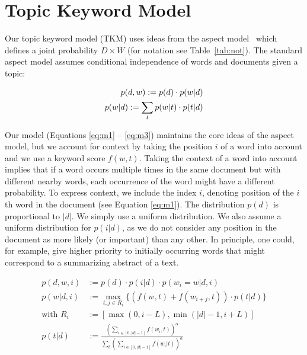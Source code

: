 \documentclass[twocolumn,10]{article}
\newcommand{\ci}{~\cite} \newcommand{\re}{~\ref} \newcommand{\ma}{\mathbb}
\begin{document}
	\section{Topic Keyword Model} \label{sec:tom}
	Our topic keyword model (TKM) uses ideas from the aspect model\ci{hof01} which defines a joint probability $D \times W$ (for notation see Table\re{tab:not}). The standard aspect model assumes conditional independence of words and documents given a topic: 
	
	\begin{footnotesize}
		\begin{equation} 
		\begin{aligned}		
		p(d,w):= p(d)\cdot p(w|d) \\
		p(w|d):=\sum_t p(w|t)\cdot p(t|d) \label{eq:amod}	
		\end{aligned}	
		\vspace{-5pt}
		\end{equation} 	
	\end{footnotesize}
	
	Our model (Equations \ref{eq:m1} -- \ref{eq:m3}) maintains the core ideas of the aspect model, but we account for context by taking the position $i$ of a word into account and we use a keyword score $f(w,t)$. Taking the context of a word into account implies that if a word occurs multiple times in the same document but with different nearby words, each occurrence of the word might have a different probability. To express context, we include the index $i$, denoting position of the $i$th word in the document (see Equation \ref{eq:m1}). The distribution $p(d)$ is proportional to $|d|$. We simply use a uniform distribution. We also assume a uniform distribution for $p(i|d)$, as we do not consider any position in the document as more likely (or important) than any other. In principle, one could, for example, give higher priority to initially occurring words that might correspond to a summarizing abstract of a text.\\ 
	
	\begin{mymathbox}[title=Model Equations,boxsep=1pt,left=0pt,right=1pt,top=0pt,bottom=0pt]%
		\begin{small}
			\vspace{-5pt}
			\begin{align}		
			p(d,w,i)&:= p(d) \cdot p(i|d) \cdot p(w_i=w|d,i) \label{eq:m1}\\
			p(w|d,i)&:=\max_{t,j \in R_i} \{(f(w,t)+f(w_{i+j},t))\cdot p(t|d)\} \label{eq:m2}\\	
			\text{with } R_i&:=[\max(0,i-L),\min(|d|-1,i+L)] \nonumber \\ 
			p(t|d)& := \frac{(\sum_{i \in [0,|d|-1]} f(w_i,t))^{\alpha}}{\sum_t (\sum_{i \in [0,|d|-1]} f(w_i|t))^{\alpha}} \label{eq:m3}
			\end{align} 
		\end{small}
	\end{mymathbox}
	
\end{document}
